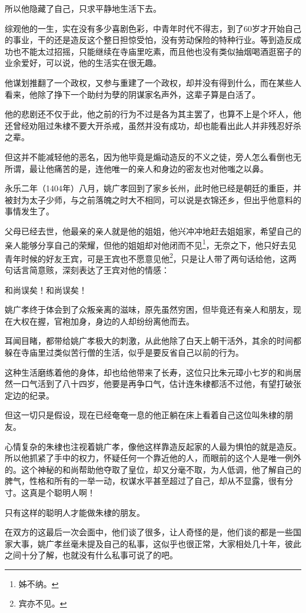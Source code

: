 \begin{multicols}{\theparacolNo}
所以他隐藏了自己，只求平静地生活下去。

综观他的一生，实在没有多少喜剧色彩，中青年时代不得志，到了60岁才开始自己的事业，干的还是造反这个整日担惊受怕，没有劳动保险的特种行业。等到造反成功也不能太过招摇，只能继续在寺庙里吃素，而且他也没有类似抽烟喝酒逛窑子的业余爱好，可以说，他的生活实在很无趣。

他谋划推翻了一个政权，又参与重建了一个政权，却并没有得到什么，而在某些人看来，他除了挣下一个助纣为孽的阴谋家名声外，这辈子算是白活了。

他的悲剧还不仅于此，他之前的行为不过是各为其主罢了，也算不上是个坏人，他还曾经劝阻过朱棣不要大开杀戒，虽然并没有成功，却也能看出此人并非残忍好杀之辈。

但这并不能减轻他的恶名，因为他毕竟是煽动造反的不义之徒，旁人怎么看倒也无所谓，最让他痛苦的是，连他唯一的亲人和身边的密友也对他嗤之以鼻。

永乐二年（1404年）八月，姚广孝回到了家乡长州，此时他已经是朝廷的重臣，并被封为太子少师，与之前落魄之时大不相同，可以说是衣锦还乡，但出乎他意料的事情发生了。

父母已经去世，他最亲的亲人就是他的姐姐，他兴冲冲地赶去姐姐家，希望自己的亲人能够分享自己的荣耀，但他的姐姐却对他闭而不见\footnote{姊不纳。}，无奈之下，他只好去见青年时候的好友王宾，可是王宾也不愿意见他\footnote{宾亦不见。}，只是让人带了两句话给他，这两句话言简意赅，深刻表达了王宾对他的情感：

和尚误矣！和尚误矣！

姚广孝终于体会到了众叛亲离的滋味，原先虽然穷困，但毕竟还有亲人和朋友，现在大权在握，官袍加身，身边的人却纷纷离他而去。

耳闻目睹，都带给姚广孝极大的刺激，从此他除了白天上朝干活外，其余的时间都躲在寺庙里过类似苦行僧的生活，似乎是要反省自己以前的行为。

这种生活磨练着他的身体，却也给他带来了长寿，这位只比朱元璋小七岁的和尚居然一口气活到了八十四岁，他要是再争口气，估计连朱棣都活不过他，有望打破张定边的纪录。

但这一切只是假设，现在已经奄奄一息的他正躺在床上看着自己这位叫朱棣的朋友。

心情复杂的朱棣也注视着姚广孝，像他这样靠造反起家的人最为惧怕的就是造反。所以他抓紧了手中的权力，怀疑任何一个靠近他的人，而眼前的这个人是唯一例外的。这个神秘的和尚帮助他夺取了皇位，却又分毫不取，为人低调，他了解自己的脾气，性格和所有的一举一动，权谋水平甚至超过了自己，却从不显露，很有分寸。这真是个聪明人啊！

只有这样的聪明人才能做朱棣的朋友。

在双方的这最后一次会面中，他们谈了很多，让人奇怪的是，他们谈的都是一些国家大事，姚广孝丝毫未提及自己的私事，这似乎也很正常，大家相处几十年，彼此之间十分了解，也就没有什么私事可说了的吧。


\end{multicols}
